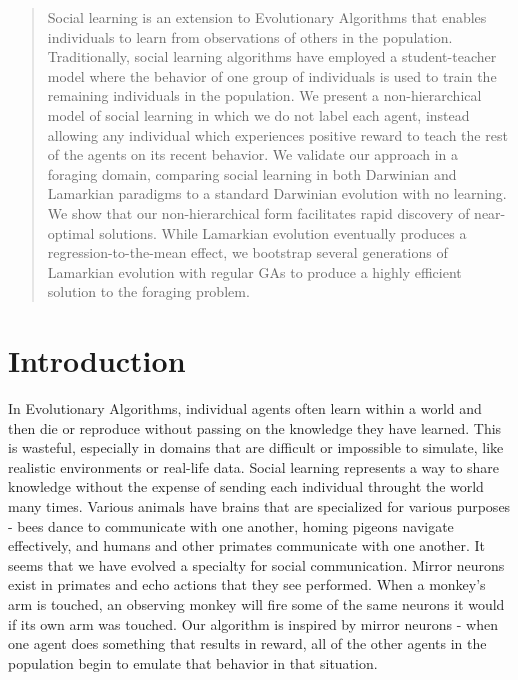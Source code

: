 \documentclass{acm_proc_article-sp}
\begin{document}
\maketitle
\begin{abstract}
Social learning is an extension to Evolutionary Algorithms that enables individuals to learn from observations of others in the population.
 Traditionally, social learning algorithms have employed a student-teacher model where the behavior of one group of individuals is used to train the remaining individuals in the population.  
 We present a non-hierarchical model of social learning in which we do not label each agent, instead allowing any individual which experiences positive reward to teach the rest of the agents on its recent behavior. 
 We validate our approach in a foraging domain, comparing social learning in both Darwinian and Lamarkian paradigms to a standard Darwinian evolution with no learning. 
 We show that our non-hierarchical form facilitates rapid discovery of near-optimal solutions.  While Lamarkian evolution eventually produces a regression-to-the-mean effect, we bootstrap several generations of Lamarkian evolution with regular GAs to produce a highly efficient solution to the foraging problem.
\end{abstract}



\section{Introduction} 
	In Evolutionary Algorithms, individual agents often learn within a world and then die or reproduce without passing on the knowledge they have learned.  This is wasteful, especially in domains that are difficult or impossible to simulate, like realistic environments or real-life data.  Social learning represents a way to share knowledge without the expense of sending each individual throught the world many times.
	Various animals have brains that are specialized for various purposes - bees dance to communicate with one another, homing pigeons navigate effectively, and humans and other primates communicate with one another.  It seems that we have evolved a specialty for social communication. 
Mirror neurons exist in primates and echo actions that they see performed.  When a monkey's arm is touched, an observing monkey will fire some of the same neurons it would if its own arm was touched. \cite{gallese-98}  Our algorithm is inspired by mirror neurons - when one agent does something that results in reward, all of the other agents in the population begin to emulate that behavior in that situation.
    
\end{document}
